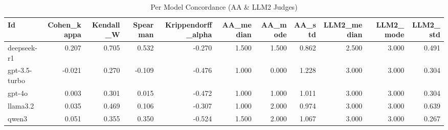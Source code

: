 \begin{table}
\caption{Per Model Concordance (AA & LLM2 Judges)}
\label{tab:per_model_concordance_AA_LLM2_judges}
\begin{tabular}{lrrrrrrrrrr}
\toprule
Id & Cohen_kappa & Kendall_W & Spearman & Krippendorff_alpha & AA_median & AA_mode & AA_std & LLM2_median & LLM2_mode & LLM2_std \\
\midrule
deepseek-r1 & 0.207 & 0.705 & 0.532 & -0.270 & 1.500 & 1.500 & 0.862 & 2.500 & 3.000 & 0.491 \\
gpt-3.5-turbo & -0.021 & 0.270 & -0.109 & -0.476 & 1.000 & 0.000 & 1.228 & 3.000 & 3.000 & 0.304 \\
gpt-4o & 0.003 & 0.301 & 0.015 & -0.472 & 1.000 & 1.000 & 1.011 & 3.000 & 3.000 & 0.304 \\
llama3.2 & 0.035 & 0.469 & 0.106 & -0.307 & 1.000 & 2.000 & 0.974 & 3.000 & 3.000 & 0.639 \\
qwen3 & 0.051 & 0.355 & 0.350 & -0.524 & 1.500 & 2.000 & 1.067 & 3.000 & 3.000 & 0.267 \\
\bottomrule
\end{tabular}
\end{table}
